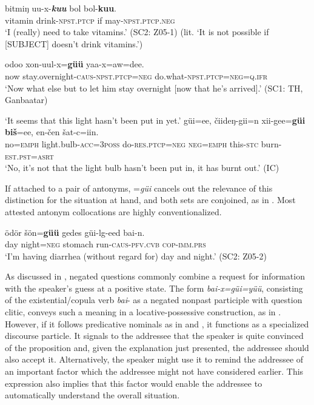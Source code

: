 \documentclass[output=paper,colorlinks,citecolor=brown,chinesefont]{langscibook}
\begin{document}
\ea\label{ex:kha:88}
    \gll bitmiŋ uu-x-\textbf\textit{kuu} bol bol-\textbf{kuu}. \\ 
         vitamin drink-\textsc{npst.ptcp} if may-\textsc{npst.ptcp.neg} \\
    \glt ‘I (really) need to take vitamins.’ (SC2: Z05-1) (lit. ‘It is not possible if [SUBJECT] doesn’t drink vitamins.’) 
\z 
 
\ea\label{ex:kha:89}
    \gll odoo xon-uul-x=\textbf{güü} yaa-x=aw=dee.\\
         now stay.overnight-\textsc{caus-npst.ptcp=neg} do.what-\textsc{npst.ptcp=neg=q.ifr}\\
    \glt ‘Now what else but to let him stay overnight [now that he’s arrived].’ (SC1: TH, Ganbaatar)
\z 
 

\ea\label{ex:kha:90} 
    \begin{xlist}
         ‘It seems that this light hasn’t been put in yet.’
            \gll güi=ee, čiideŋ-gii=n xii-gee=\textbf{güi} \textbf{biš}=ee, en-čen šat-c=iin. \\ 
                 no=\textsc{emph} light.bulb-\textsc{acc=3poss} do-\textsc{res.ptcp=neg} \textsc{neg=emph} this-\textsc{stc} burn-\textsc{est.pst=asrt} \\
            \glt ‘No, it’s not that the light bulb hasn’t been put in, it has burnt out.’ (IC)
    \end{xlist}
\z 

\newpage
If attached to a pair of antonyms, =\textit{güi} cancels out the relevance of this distinction for the situation at hand, and both sets are conjoined, as in . Most attested antonym collocations are highly conventionalized. 

\ea\label{ex:kha:91}
    \gll ödör šön=\textbf{güü} gedes güi-lg-eed bai-n. \\ 
         day night=\textsc{neg} stomach run-\textsc{caus-pfv.cvb} \textsc{cop-imm.prs} \\
    \glt ‘I’m having diarrhea (without regard for) day and night.’ (SC2: Z05-2)
\z 

As discussed in , negated questions commonly combine a request for information with the speaker’s guess at a positive state. The form \textit{bai-x=güi=yüü}, consisting of the existential/copula verb \textit{bai}{}- as a negated nonpast participle with question clitic, conveys such a meaning in a locative-possessive construction, as in . However, if it follows predicative nominals as in  and , it functions as a specialized discourse particle. It signals to the addressee that the speaker is quite convinced of the proposition and, given the explanation just presented, the addressee should also accept it. Alternatively, the speaker might use it to remind the addressee of an important factor which the addressee might not have considered earlier. This expression also implies that this factor would enable the addressee to automatically understand the overall situation.
    
\end{document}
